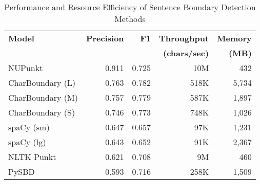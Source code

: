 \begin{table}[htbp]
\centering
\caption{Performance and Resource Efficiency of Sentence Boundary Detection Methods}
\label{tab:main-results}
\begin{tabular}{lrrrr}
\toprule
\textbf{Model} & \textbf{Precision} & \textbf{F1} & \textbf{Throughput} & \textbf{Memory} \\
 &  &  & \textbf{(chars/sec)} & \textbf{(MB)} \\
\midrule
NUPunkt & 0.911 & 0.725 & 10M & 432 \\
CharBoundary (L) & 0.763 & 0.782 & 518K & 5,734 \\
CharBoundary (M) & 0.757 & 0.779 & 587K & 1,897 \\
CharBoundary (S) & 0.746 & 0.773 & 748K & 1,026 \\
spaCy (sm) & 0.647 & 0.657 & 97K & 1,231 \\
spaCy (lg) & 0.643 & 0.652 & 91K & 2,367 \\
NLTK Punkt & 0.621 & 0.708 & 9M & 460 \\
PySBD & 0.593 & 0.716 & 258K & 1,509 \\
\bottomrule
\end{tabular}
\end{table}